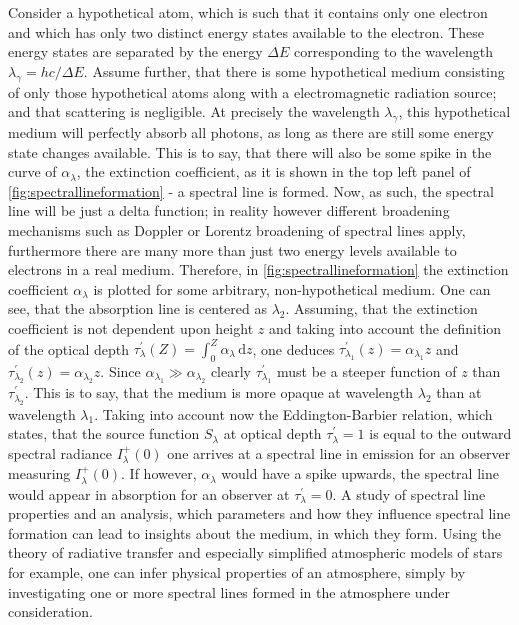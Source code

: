 \documentclass[a4paper,12pt]{report}
\begin{document}
Consider a hypothetical atom, which is such that it contains only one electron and which has only two distinct energy states available to the electron. These energy states are separated by the energy $\Delta E$ corresponding to the wavelength $\lambda_\gamma = hc/\Delta E$. Assume further, that there is some hypothetical medium consisting of only those hypothetical atoms along with a electromagnetic radiation source; and that scattering is negligible. At precisely the wavelength $\lambda_\gamma$, this hypothetical medium will perfectly absorb all photons, as long as there are still some energy state changes available. This is to say, that there will also be some spike in the curve of $\alpha_\lambda$, the extinction coefficient, as it is shown in the top left panel of \cref{fig:spectrallineformation} - a spectral line is formed. Now, as such, the spectral line will be just a delta function; in reality however different broadening mechanisms such as Doppler or Lorentz broadening of spectral lines apply, furthermore there are many more than just two energy levels available to electrons in a real medium. Therefore, in \cref{fig:spectrallineformation} the extinction coefficient $\alpha_\lambda$ is plotted for some arbitrary, non-hypothetical medium. One can see, that the absorption line is centered as $\lambda_2$. Assuming, that the extinction coefficient is not dependent upon height $z$ and taking into account the definition of the optical depth $\tau_\lambda^\prime(Z) = \int_{0}^{Z}\alpha_\lambda \,\mathrm{d}z$, one deduces $\tau_{\lambda_1}^\prime(z) = \alpha_{\lambda_1}z$ and $\tau_{\lambda_2}^\prime(z) = \alpha_{\lambda_2}z$. Since $\alpha_{\lambda_1} \gg \alpha_{\lambda_2}$ clearly $\tau_{\lambda_1}^\prime$ must be a steeper function of $z$ than $\tau_{\lambda_2}^\prime$. This is to say, that the medium is more opaque at wavelength $\lambda_2$ than at wavelength $\lambda_1$. Taking into account now the Eddington-Barbier relation, which states, that the source function $S_\lambda$ at optical depth $\tau_\lambda^\prime= 1$ is equal to the outward spectral radiance $I_\lambda^+(0)$ one arrives at a spectral line in emission for an observer measuring $I_\lambda^+(0)$. If however, $\alpha_\lambda$ would have a spike upwards, the spectral line would appear in absorption for an observer at $\tau_\lambda^\prime = 0$.
A study of spectral line properties and an analysis, which parameters and how they influence spectral line formation can lead to insights about the medium, in which they form. Using the theory of radiative transfer and especially simplified atmospheric models of stars for example, one can infer physical properties of an atmosphere, simply by investigating one or more spectral lines formed in the atmosphere under consideration.
\end{document}
